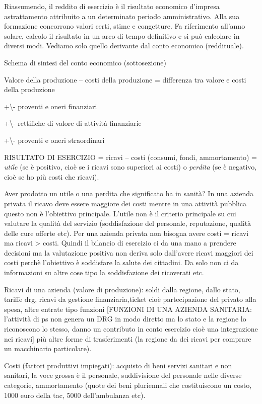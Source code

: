 \documentclass[]{article}
\begin{document}
Riassumendo, il reddito di esercizio è il risultato economico d'impresa
astrattamento attribuito a un determinato periodo amministrativo. Alla
sua formazione concorrono valori certi, stime e congetture. Fa
riferimento all'anno solare, calcolo il risultato in un arco di tempo
definitivo e si può calcolare in diversi modi. Vediamo solo quello
derivante dal conto economico (reddituale).

Schema di sintesi del conto economico (sottosezione)

Valore della produzione -- costi della produzione = differenza tra
valore e costi della produzione

+\textbackslash{}- proventi e oneri finanziari

+\textbackslash{}- rettifiche di valore di attività finanziarie

+\textbackslash{}- proventi e oneri straordinari

RISULTATO DI ESERCIZIO = ricavi -- costi (consumi, fondi, ammortamento)
= \emph{utile} (se è positivo, cioè se i ricavi sono superiori ai costi)
o \emph{perdita} (se è negativo, cioè se ho più costi che ricavi).

Aver prodotto un utile o una perdita che significato ha in sanità? In
una azienda privata il ricavo deve essere maggiore dei costi mentre in
una attività pubblica questo non è l'obiettivo principale. L'utile non è
il criterio principale su cui valutare la qualità del servizio
(soddisfazione del personale, reputazione, qualità delle cure offerte
etc). Per una azienda privata non bisogna avere costi = ricavi ma ricavi
\textgreater{} costi. Quindi il bilancio di esercizio ci da una mano a
prendere decisioni ma la valutazione positiva non deriva solo dall'avere
ricavi maggiori dei costi perchè l'obiettivo è soddisfare la salute dei
cittadini. Da solo non ci da informazioni su altre cose tipo la
soddisfazione dei ricoverati etc.

Ricavi di una azienda (valore di produzione): soldi dalla regione, dallo
stato, tariffe drg, ricavi da gestione finanziaria,ticket cioè
partecipazione del privato alla spesa, altre entrate tipo funzioni
{[}FUNZIONI DI UNA AZIENDA SANITARIA: l'attività di ps non genera un DRG
in modo diretto ma lo stato e la regione lo riconoscono lo stesso, danno
un contributo in conto esercizio cioè una integrazione nei ricavi{]} più
altre forme di trasferimenti (la regione da dei ricavi per comprare un
macchinario particolare).

Costi (fattori produttivi impiegati): acquisto di beni servizi sanitari
e non sanitari, la voce grossa è il personale, suddivisione del
personale nelle diverse categorie, ammortamento (quote dei beni
pluriennali che costituiscono un costo, 1000 euro della tac, 5000
dell'ambulanza etc).
\end{document}
